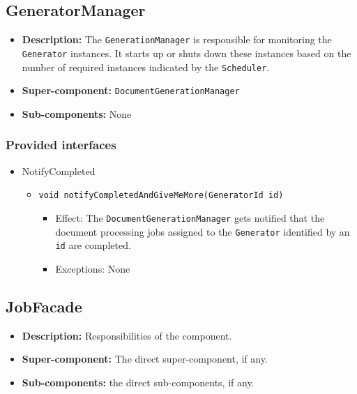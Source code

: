 \documentclass[a4paper,10pt]{article}
\begin{document}
\subsection{GeneratorManager}
\begin{itemize}
    \item \textbf{Description:} The \texttt{GenerationManager} is responsible for monitoring the \texttt{Generator} instances. It starts up or shuts down these instances based on the number of required instances indicated by the \texttt{Scheduler}.
    \item \textbf{Super-component:}  \texttt{DocumentGenerationManager}
    \item \textbf{Sub-components:} None
\end{itemize}

\subsubsection*{Provided interfaces}
\begin{itemize}
    \item NotifyCompleted
    \begin{itemize}
        \item \texttt{void notifyCompletedAndGiveMeMore(GeneratorId id)}
        \begin{itemize}
            \item Effect: The \texttt{DocumentGenerationManager} gets notified that the document processing jobs assigned to the \texttt{Generator} identified by an \texttt{id} are completed. 
            \item Exceptions: None
        \end{itemize}
    \end{itemize}
\end{itemize}

\subsection{JobFacade}
\begin{itemize}
    \item \textbf{Description:} Responsibilities of the component.
    \item \textbf{Super-component:} The direct super-component, if any.
    \item \textbf{Sub-components:} the direct sub-components, if any.
\end{itemize}
\end{document}
